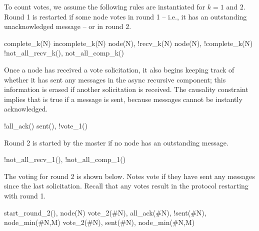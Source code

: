 To count votes, we assume the following rules are instantiated for $k=1$ and $2$.  Round 1 is restarted if some node votes  in round 1 -- i.e., it has an outstanding unacknowledged message -- or  in round 2.

\begin{Drules}
      {complete_k(N)}
      {incomplete_k(N)}
      {node(N), !recv_k(N)}
      {node(N), !complete_k(N)}
      {!not_all_recv_k(), not_all_comp_k()}
\end{Drules}

Once a node has received a  vote solicitation, it also begins keeping track of whether it has sent any messages in the async recursive component; this information is erased if another  solicitation is received.  The causality constraint implies that  is true if a message is sent, because messages cannot be instantly acknowledged.

\begin{Drules}
      {!all_ack()}
      {sent(), !vote_1()}
\end{Drules}

Round 2 is started by the master if no node has an outstanding message.

\begin{Drules}
      {!not_all_recv_1(), !not_all_comp_1()}
\end{Drules}

The voting for round 2 is shown below.  Notes vote  if they have sent any messages since the last  solicitation.  Recall that any  votes result in the protocol restarting with round 1.

\begin{Drules}
      {start_round_2(), node(N)}
      {vote_2(#N), all_ack(#N), !sent(#N), node_min(#N,M)}
      {vote_2(#N), sent(#N), node_min(#N,M)}
\end{Drules}

